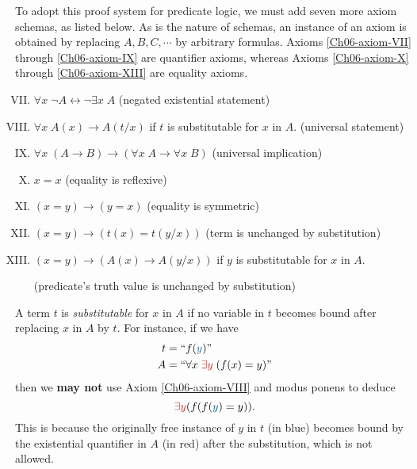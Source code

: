 To adopt this proof system for predicate logic, we must add seven more axiom schemas, as listed below.  As is the nature of schemas, an instance of an axiom is obtained by replacing \(A, B, C, \cdots\) by arbitrary formulas. Axioms \ref{Ch06-axiom-VII} through \ref{Ch06-axiom-IX} are quantifier axioms, whereas Axioms \ref{Ch06-axiom-X} through \ref{Ch06-axiom-XIII} are equality axioms.
%
\begin{enumerate}[I.]
    \setcounter{enumi}{6}
    \item \(\forall x\; \neg A \leftrightarrow \neg\exists x\; A\)
    \hfill (negated existential statement)
    \label{Ch06-axiom-VII}
    
    \item \(\forall x\; A(x) \rightarrow A(t/x)\) \;\; if \(t\) is substitutable for \(x\) in \(A\).
    \hfill (universal statement)
    \label{Ch06-axiom-VIII}
    
    \item \(\forall x\; (A \rightarrow B) \rightarrow (\forall x\; A \rightarrow \forall x\; B)\)
    \hfill (universal implication)
    \label{Ch06-axiom-IX}

    \item \(x = x\)
    \hfill (equality is reflexive)
    \label{Ch06-axiom-X}
    
    \item \((x = y) \rightarrow (y = x)\)
    \hfill (equality is symmetric)
    \label{Ch06-axiom-XI}
    
    \item \((x = y) \rightarrow (t(x) = t(y/x))\)
    \hfill (term is unchanged by substitution)
    \label{Ch06-axiom-XII}

    \item \((x = y) \rightarrow (A(x) \rightarrow A(y/x))\)\;\; if \(y\) is substitutable for \(x\) in \(A\).
    
    \hfill (predicate's truth value is unchanged by substitution)
    \label{Ch06-axiom-XIII}
\end{enumerate}

A term \(t\) is \emph{substitutable} for \(x\) in \(A\) if no variable in \(t\) becomes bound after replacing \(x\) in \(A\) by \(t\). For instance, if we have
%
\begin{align*}
    t &= ``f({\color{MidnightBlue} y})"\\
    A &= ``\forall x\; {\color{BrickRed}\exists y}\; (f(x) = y)"
\end{align*}
%
then we \textbf{may not} use Axiom \ref{Ch06-axiom-VIII} and modus ponens to deduce
%
\[{\color{BrickRed}\exists y} (f(f({\color{MidnightBlue} y}) = y))\text{.}\]
%
This is because the originally free instance of \(y\) in \(t\) (in blue) becomes bound by the existential quantifier in \(A\) (in red) after the substitution, which is not allowed.

